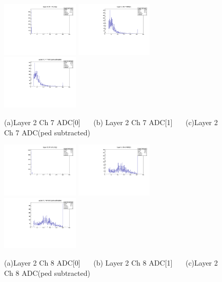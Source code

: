 \documentclass[a4paper,11pt]{article}
\theoremstyle{mytheor}
\begin{document}
\begin{figure}[H] 
\vspace*{-0.3cm} 
\includegraphics[width=0.33\textwidth,scale=0.5,trim=0 0 0 0,clip]{plotsdir/file0_muons-Layer2_Ch7_adc0-1.pdf} 
\includegraphics[width=0.33\textwidth,scale=0.5,trim=0 0 0 0,clip]{plotsdir/file0_muons-Layer2_Ch7_adc1-1.pdf} 
\includegraphics[width=0.33\textwidth,scale=0.5,trim=0 0 0 0,clip]{plotsdir/file0_muons-Layer2_Ch7_adcPedsub-1.pdf} 
\caption{(a)Layer 2 Ch 7 ADC[0] ~~~(b) Layer 2 Ch 7 ADC[1] ~~~(c)Layer 2 Ch 7 ADC(ped subtracted) } 
\end{figure} 
\begin{figure}[H] 
\vspace*{-0.3cm} 
\includegraphics[width=0.33\textwidth,scale=0.5,trim=0 0 0 0,clip]{plotsdir/file0_muons-Layer2_Ch8_adc0-1.pdf} 
\includegraphics[width=0.33\textwidth,scale=0.5,trim=0 0 0 0,clip]{plotsdir/file0_muons-Layer2_Ch8_adc1-1.pdf} 
\includegraphics[width=0.33\textwidth,scale=0.5,trim=0 0 0 0,clip]{plotsdir/file0_muons-Layer2_Ch8_adcPedsub-1.pdf} 
\caption{(a)Layer 2 Ch 8 ADC[0] ~~~(b) Layer 2 Ch 8 ADC[1] ~~~(c)Layer 2 Ch 8 ADC(ped subtracted) } 
\end{figure} 
\end{document}
